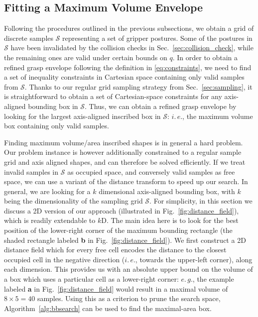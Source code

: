 \subsection{Fitting a Maximum Volume Envelope}
\label{sec:fitting_bb}
%
Following the procedures outlined in the previous subsections, we obtain a grid of discrete samples $\mathcal{S}$ representing a set of gripper postures.
Some of the postures in $\mathcal{S}$ have been invalidated by the collision checks in Sec.~\ref{sec:collision_check}, while the remaining ones are valid under certain bounds on $q$.
In order to obtain a refined grasp envelope following the definition in \eqref{eq:constraints}, we need to find a set of inequality constraints in Cartesian space containing only valid samples from $\mathcal{S}$. 
Thanks to our regular grid sampling strategy from Sec.~\ref{sec:sampling}, it is straightforward to obtain a set of Cartesian-space constraints for any axis-aligned bounding box in $\mathcal{S}$.
Thus, we can obtain a refined grasp envelope by looking for the largest axis-aligned inscribed box in $\mathcal{S}$: $i.\,e.$, the maximum volume box containing only valid samples.
\par
Finding maximum volume/area inscribed shapes is in general a hard problem.
Our problem instance is however additionally constrained to a regular sample grid and axis aligned shapes, and can therefore be solved efficiently.
If we treat invalid samples in $\mathcal{S}$ as occupied space, and conversely valid samples as free space, we can use a variant of the distance transform to speed up our search.
In general, we are looking for a $k$ dimensional axis-aligned bounding box, with $k$ being the dimensionality of the sampling grid $\mathcal{S}$. 
For simplicity, in this section we discuss a 2D version of our approach (illustrated in Fig.~\ref{fig:distance_field}), which is readily extendable to $k$D.
The main idea here is to look for the best position of the lower-right corner of the maximum bounding rectangle (the shaded rectangle labeled \textbf{b} in Fig.~\ref{fig:distance_field}).
We first construct a 2D distance field which for every free cell encodes the distance to the closest occupied cell in the negative direction ($i.\,e.$, towards the upper-left corner), along each dimension.
This provides us with an absolute upper bound on the volume of a box which uses a particular cell as a lower-right corner: $e.\,g.$, the example labeled \textbf{a} in Fig.~\ref{fig:distance_field} would result in a maximal volume of $8\times5=40$ samples.
Using this as a criterion to prune the search space, Algorithm~\ref{alg:bbsearch} can be used to find the maximal-area box. 
